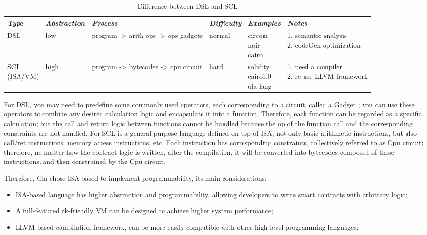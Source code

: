 \begin{table}[!ht]
    \centering
    \begin{tabular}{|l|l|l|l|l|l|}
    \hline
        \emph{Type} & \emph{Abstraction} & \emph{Process} & \emph{Difficulty} & \emph{Examples} & \emph{Notes} \\ \hline
        DSL & low & program -> arith-ops -> ops gadgets & normal & \makecell{circom \\ noir \\ cairo} & \makecell{1. semantic analysis \\ 2. codeGen optimization} \\
        \makecell{SCL \\ (ISA/VM)} & high & program -> bytecodes -> cpu circuit & hard & \makecell{solidity \\ cairo1.0 \\ ola lang} & \makecell{1. need a compiler \\2. re-use LLVM framework} \\
    \end{tabular}
    \caption{Difference between DSL and SCL}
    \label{table:Difference between DSL and SCL}
\end{table}

For DSL, you may need to predefine some commonly used operators, each corresponding to a circuit, called a Gadget \cite{website:Gadget}; you can use these operators to combine any desired calculation logic and 
encapsulate it into a function, Therefore, each function can be regarded as a specific calculation; but the call and return logic between functions cannot be handled because the op of the function
 call and the corresponding constraints are not handled. For SCL is a general-purpose language defined on top of ISA, not only basic arithmetic instructions, but also call/ret instructions, 
 memory access instructions, etc. Each instruction has corresponding constraints, collectively referred to as Cpu circuit; therefore, no matter how the contract logic is written, after the 
 compilation, it will be converted into bytecodes composed of these instructions, and then constrained by the Cpu circuit.

 Therefore, Ola chose ISA-based to implement programmability, its main considerations:
 \begin{itemize}
 \item ISA-based language has higher abstraction and programmability, allowing developers to write smart contracts with arbitrary logic;
 \item A full-featured zk-friendly VM can be designed to achieve higher system performance;
 \item LLVM-based compilation framework, can be more easily compatible with other high-level programming languages;
\end{itemize}